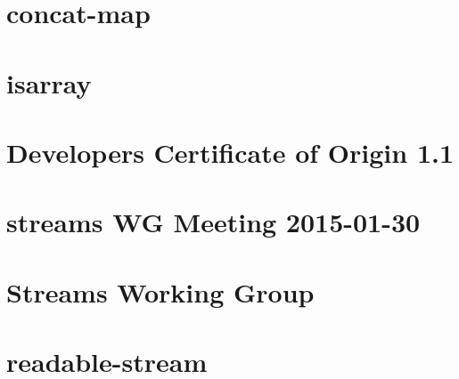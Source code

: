 \documentclass[twoside]{book}
\newcommand{\+}{\discretionary{\mbox{\scriptsize$\hookleftarrow$}}{}{}}
\begin{document}
\chapter{concat-\/map}
\label{md_dsmacc_vis_degree_node_modules_concat-map_README}

\chapter{isarray}
\label{md_dsmacc_vis_degree_node_modules_concat-stream_node_modules_isarray_README}

\chapter{Developer\textquotesingle{}s Certificate of Origin 1.1}
\label{md_dsmacc_vis_degree_node_modules_concat-stream_node_modules_readable-stream_CONTRIBUTING}

\chapter{streams WG Meeting 2015-\/01-\/30}
\label{md_dsmacc_vis_degree_node_modules_concat-stream_node_modules_readable-stream_doc_wg-meetings_2015-01-30}

\chapter{Streams Working Group}
\label{md_dsmacc_vis_degree_node_modules_concat-stream_node_modules_readable-stream_GOVERNANCE}

\chapter{readable-\/stream}
\label{md_dsmacc_vis_degree_node_modules_concat-stream_node_modules_readable-stream_README}

\end{document}

